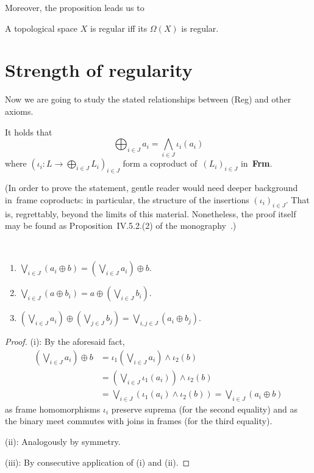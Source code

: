 Moreover, the proposition leads us to
\begin{cor}
  A topological space $X$ is regular iff its $\Omega(X)$ is regular.
\end{cor}

\section{Strength of regularity}

Now we are going to study the stated relationships between (Reg) and other
axioms.

\begin{fact}
  It holds that
  \[
    \bigoplus_{i\in J} a_i = \bigwedge_{i\in J} \iota_i(a_i)
  \]
  where $(\iota_i\colon L \to \bigoplus_{i\in J} L_i)_{i\in J}$ form a
  coproduct of~$(L_i)_{i\in J}$ in~{\bf Frm}.
\end{fact}
(In order to prove the statement, gentle reader would need deeper background
in~frame coproducts:
in particular, the structure of the insertions $(\iota_i)_{i\in J}$.
That is, regrettably, beyond the limits of this material.
Nonetheless, the proof itself may be found as Proposition~IV.5.2.(2) of the
monography~\cite{picado-pultr12}.)

\begin{lem} \label{oplus-vee-distrib}
  ~
  \begin{enumerate}
  \item $\bigvee_{i\in J} \left(a_i \oplus b\right) = \left(\bigvee_{i\in J}
    a_i \right) \oplus b$.
  \item $\bigvee_{i\in J} \left(a \oplus b_i\right) = a \oplus
    \left(\bigvee_{i\in J} b_i \right)$.
  \item $\left(\bigvee_{i\in J} a_i\right) \oplus \left(\bigvee_{j\in J}
    b_j\right) = \bigvee_{i, j\in J} \left(a_i \oplus b_j\right)$.
  \end{enumerate}
\end{lem}
\begin{proof}
  (i):
  By the aforesaid fact,
  \begin{align*}
    \left(\bigvee_{i\in J} a_i \right) \oplus b
    &= \iota_1\left(\bigvee_{i\in J} a_i \right) \wedge \iota_2(b) \\
    &= \left(\bigvee_{i\in J} \iota_1(a_i) \right) \wedge \iota_2(b) \\
    &= \bigvee_{i\in J} \left(\iota_1(a_i) \wedge \iota_2(b) \right)
    = \bigvee_{i\in J} \left(a_i \oplus b\right)
  \end{align*}
  as frame homomorphisms $\iota_i$ preserve suprema (for the second equality)
  and as the binary meet commutes with joins in frames (for the third
  equality).

  (ii):
  Analogously by symmetry.

  (iii):
  By consecutive application of (i) and (ii).
\end{proof}

